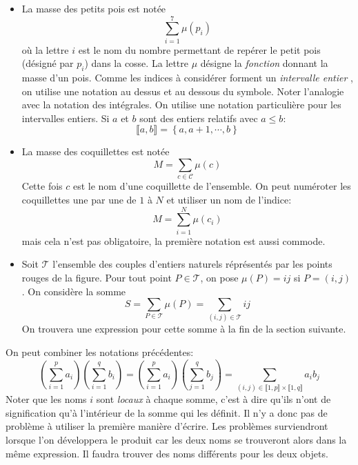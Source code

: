 \begin{itemize}
  \item La masse des petits pois est notée
  \begin{displaymath}
  \sum_{i=1}^7\mu(p_i)  
  \end{displaymath}
  où la lettre $i$ est le nom du nombre permettant de repérer le petit pois (désigné par $p_i$) dans la cosse. La lettre $\mu$ désigne la \emph{fonction} donnant la masse d'un pois. Comme les indices à considérer forment un \emph{intervalle entier} , on utilise une notation au dessus et au dessous du symbole. Noter l'analogie avec la notation des intégrales.\newline
  On utilise une notation particulière pour les intervalles entiers. Si $a$ et $b$ sont des entiers relatifs avec $a\leq b$:
  \begin{displaymath}
    \llbracket a , b \rrbracket = \left\lbrace a,a+1, \cdots, b\right\rbrace 
  \end{displaymath}

  \item La masse des coquillettes est notée 
  \begin{displaymath}
    M = \sum_{c \in \mathcal{C}}\mu(c)
  \end{displaymath}
  Cette fois $c$ est le nom d'une coquillette de l'ensemble. On peut numéroter les coquillettes une par une de $1$ à $N$ et utiliser un nom de l'indice:
  \begin{displaymath}
    M = \sum_{i=1}^N \mu(c_i)
  \end{displaymath}
  mais cela n'est pas obligatoire, la première notation est aussi commode.
  
  \item Soit $\mathcal T$ l'ensemble des couples d'entiers naturels réprésentés par les points rouges de la figure. Pour tout point $P\in \mathcal T$, on pose $\mu(P)= ij$ si $P=(i,j)$. On considère la somme
\begin{displaymath}
S = \sum_{P\in \mathcal T} \mu(P) = \sum_{(i,j)\in \mathcal T} ij                                                                                                                                                                                         \end{displaymath}
On trouvera une expression pour cette somme à la fin de la section suivante.
\end{itemize}

On peut combiner les notations précédentes:
\begin{displaymath}
  \left( \sum_{i=1}^pa_i\right)\left( \sum_{i=1}^qb_i\right)
=   \left( \sum_{i=1}^pa_i\right)\left( \sum_{j=1}^qb_j\right)
= \sum_{(i,j)\in \llbracket 1,p\rrbracket \times \llbracket 1,q \rrbracket}a_ib_j
\end{displaymath}
Noter que les noms $i$ sont \emph{locaux} à chaque somme, c'est à dire qu'ils n'ont de signification qu'à l'intérieur de la somme qui les définit. Il n'y a donc pas de problème à utiliser la première manière d'écrire. Les problèmes surviendront lorsque l'on développera le produit car les deux noms se trouveront alors dans la même expression. Il faudra trouver des noms différents pour les deux objets.

